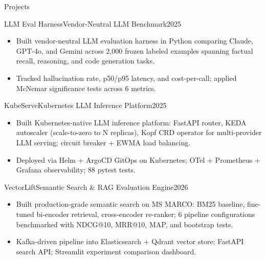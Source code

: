 \documentclass[]{mcdowellcv}
\begin{document}
\begin{cvsection}{Projects}
  \begin{cvsubsection}{LLM Eval Harness}{Vendor-Neutral LLM Benchmark}{2025}
    \begin{itemize}
      \item Built vendor-neutral LLM evaluation harness in Python comparing Claude, GPT-4o, and Gemini across 2,000 frozen labeled examples spanning factual recall, reasoning, and code generation tasks.
      \item Tracked hallucination rate, p50/p95 latency, and cost-per-call; applied McNemar significance tests across 6 metrics.
    \end{itemize}
    \vspace{-1.5pt}
  \end{cvsubsection}

  \begin{cvsubsection}{KubeServe}{Kubernetes LLM Inference Platform}{2025}
    \begin{itemize}
      \item Built Kubernetes-native LLM inference platform: FastAPI router, KEDA autoscaler (scale-to-zero to N replicas), Kopf CRD operator for multi-provider LLM serving; circuit breaker + EWMA load balancing.
      \item Deployed via Helm + ArgoCD GitOps on Kubernetes; OTel + Prometheus + Grafana observability; 88 pytest tests.
    \end{itemize}
    \vspace{-1.5pt}
  \end{cvsubsection}

  \begin{cvsubsection}{VectorLift}{Semantic Search \& RAG Evaluation Engine}{2026}
    \begin{itemize}
      \item Built production-grade semantic search on MS MARCO: BM25 baseline, fine-tuned bi-encoder retrieval, cross-encoder re-ranker; 6 pipeline configurations benchmarked with NDCG@10, MRR@10, MAP, and bootstrap tests.
      \item Kafka-driven pipeline into Elasticsearch + Qdrant vector store; FastAPI search API; Streamlit experiment comparison dashboard.
    \end{itemize}
    \vspace{-1.5pt}
  \end{cvsubsection}
\end{cvsection}
\end{document}
